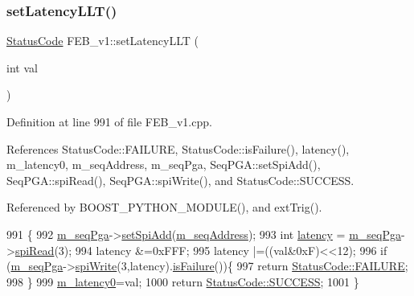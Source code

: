 \subsubsection{\texorpdfstring{set\+Latency\+L\+L\+T()}{setLatencyLLT()}}
{\footnotesize\ttfamily \hyperlink{classStatusCode}{Status\+Code} F\+E\+B\+\_\+v1\+::set\+Latency\+L\+LT (\begin{DoxyParamCaption}\item[{int}]{val }\end{DoxyParamCaption})}



Definition at line 991 of file F\+E\+B\+\_\+v1.\+cpp.



References Status\+Code\+::\+F\+A\+I\+L\+U\+RE, Status\+Code\+::is\+Failure(), latency(), m\+\_\+latency0, m\+\_\+seq\+Address, m\+\_\+seq\+Pga, Seq\+P\+G\+A\+::set\+Spi\+Add(), Seq\+P\+G\+A\+::spi\+Read(), Seq\+P\+G\+A\+::spi\+Write(), and Status\+Code\+::\+S\+U\+C\+C\+E\+SS.



Referenced by B\+O\+O\+S\+T\+\_\+\+P\+Y\+T\+H\+O\+N\+\_\+\+M\+O\+D\+U\+L\+E(), and ext\+Trig().


\begin{DoxyCode}
991                                        \{
992   \hyperlink{classFEB__v1_a6c7804ac86796f233a8393043adf2e77}{m\_seqPga}->\hyperlink{classSeqPGA_ac998ce3a6d9b5f2e88cc8393f8c1df53}{setSpiAdd}(\hyperlink{classFEB__v1_a1c1eb093fd1733b9510fcf8bc5c7ad08}{m\_seqAddress});
993   \textcolor{keywordtype}{int} \hyperlink{classFEB__v1_a68050d232efd8d6568910b09a2c18f62}{latency} = \hyperlink{classFEB__v1_a6c7804ac86796f233a8393043adf2e77}{m\_seqPga}->\hyperlink{classSeqPGA_ab3d0e5e5d4014bc7a92588a76b8713d4}{spiRead}(3);
994   latency &=0xFFF;
995   latency |=((val&0xF)<<12);
996    \textcolor{keywordflow}{if} (\hyperlink{classFEB__v1_a6c7804ac86796f233a8393043adf2e77}{m\_seqPga}->\hyperlink{classSeqPGA_ad4421841ce4ce8b88ad13f63216f0743}{spiWrite}(3,latency).\hyperlink{classStatusCode_a5dd22dc6eb2c52fc4cabc58f6dea2eb7}{isFailure}())\{
997     \textcolor{keywordflow}{return} \hyperlink{classStatusCode_a6f565cbeadc76d14c72f047e5e85eb4ba3da73d4c469762eb9d3c960368252b26}{StatusCode::FAILURE};
998   \}
999    \hyperlink{classFEB__v1_a23a3d8bfbf96490890140f13b08a02c1}{m\_latency0}=val;
1000   \textcolor{keywordflow}{return} \hyperlink{classStatusCode_a6f565cbeadc76d14c72f047e5e85eb4badd0da38d3ba0d922efd1f4619bc37ad8}{StatusCode::SUCCESS};   
1001 \}
\end{DoxyCode}
\mbox{\label{classFEB__v1_a935e78031961cff9330e82a70bf91052}} 

